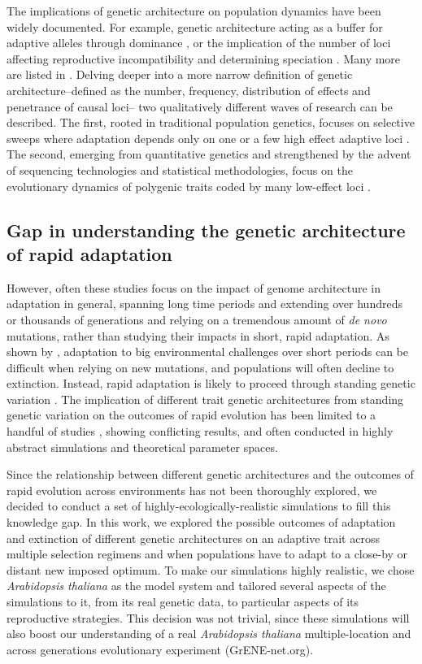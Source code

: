 \documentclass{article}
\begin{document}
The implications of genetic architecture on population dynamics have been widely documented. For example, genetic architecture acting as a buffer for adaptive alleles through dominance \citep{Yamamichi2017-uj}, or the implication of the number of loci affecting reproductive incompatibility and determining speciation \citep{Orr1996-eq}. Many more are listed in \citep{Bertram2019-sg}. Delving deeper into a more narrow definition of genetic architecture--defined as the number, frequency, distribution of effects and penetrance of causal loci-- two qualitatively different waves of research can be described. The first, rooted in traditional population genetics, focuses on selective sweeps where adaptation depends only on one or a few high effect adaptive loci \citep{Hermisson2005-ii,Barrett2008-tj}. The second, emerging from quantitative genetics and strengthened by the advent of sequencing technologies and statistical methodologies, focus on the evolutionary dynamics of polygenic traits coded by many low-effect loci \citep{John2020-xc, Jain2017-mb, Barghi2020-aa, Hayward2021-ji, Stetter2018-st, Thornton2019-ww, Hollinger2019-lb}. 

\subsection{Gap in understanding the genetic architecture of rapid adaptation}
However, often these studies focus on the impact of genome architecture in adaptation in general, spanning long time periods and extending over hundreds or thousands of generations and relying on a tremendous amount of \textit{de novo} mutations, rather than studying their impacts in short, rapid adaptation. As shown by \citep{Orr2008-jl}, adaptation to big environmental challenges over short periods can be difficult when relying on new mutations, and populations will often decline to extinction. Instead, rapid adaptation is likely to proceed through standing genetic variation \citep{Barrett2008-tj}. The implication of different trait genetic architectures from standing genetic variation on the outcomes of rapid evolution has been limited to a handful of studies \citep{Gomulkiewicz2010-wr, Kardos2021-jd}, showing conflicting results, and often conducted in highly abstract simulations and theoretical parameter spaces.

Since the relationship between different genetic architectures and the outcomes of rapid evolution across environments has not been thoroughly explored, we decided to conduct a set of highly-ecologically-realistic simulations to fill this knowledge gap. In this work, we explored the possible outcomes of adaptation and extinction of different genetic architectures on an adaptive trait across multiple selection regimens and when populations have to adapt to a close-by or distant new imposed optimum. To make our simulations highly realistic, we chose \textit{Arabidopsis thaliana} as the model system and tailored several aspects of the simulations to it, from its real genetic data, to particular aspects of its reproductive strategies. This decision was not trivial, since these simulations will also boost our understanding of a real \textit{Arabidopsis thaliana} multiple-location and across generations evolutionary experiment (GrENE-net.org). 
\end{document}

